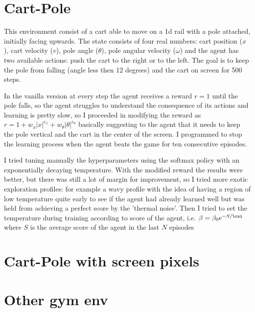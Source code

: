 \documentclass[a4paper, 11pt]{article}
\begin{document}
\section{Cart-Pole}
  This environment consist of a cart able to move on a 1d rail with a pole attached, initially facing upwards. The state consists of four real numbers: cart position ($x$), cart velocity ($v$), pole angle ($\theta$), pole angular velocity ($\omega$) and the agent has two available actions: push the cart to the right or to the left. The goal is to keep the pole from falling (angle less then 12 degrees) and the cart on screen for 500 steps.

  In the vanilla version at every step the agent receives a reward $r = 1$ until the pole falls, so the agent struggles to understand the consequence of its actions and learning is pretty slow, so I proceeded in modifying the reward as $r = 1 + w_x |x|^{e_x} + w_\theta |\theta|^{e_\theta}$ basically suggesting to the agent that it needs to keep the pole vertical and the cart in the center of the screen. I programmed to stop the learning process when the agent beats the game for ten consecutive episodes.

  I tried tuning manually the hyperparameters using the softmax policy with an exponentially decaying temperature. With the modified reward the results were better, but there was still a lot of margin for improvement, so I tried more exotic exploration profiles: for example a wavy profile with the idea of having a region of low temperature quite early to see if the agent had already learned well but was held from achieving a perfect score by the 'thermal noise'.
  Then I tried to set the temperature during training according to score of the agent, i.e. $\beta = \beta_0 e^{-S/\csi}$ where $S$ is the average score of the agent in the last $N$ episodes



\section{Cart-Pole with screen pixels}

\section{Other gym env}
\end{document}
